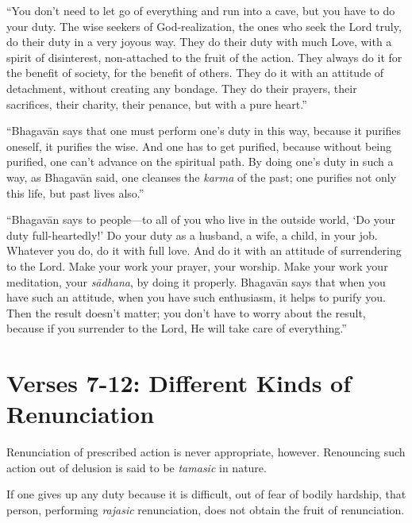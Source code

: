 \enquote{You don’t need to let go of everything and run into a cave, but you have to do your duty. The wise seekers of God-realization, the ones who seek the Lord truly, do their duty in a very joyous way. They do their duty with much Love, with a spirit of disinterest, non-attached to the fruit of the action. They always do it for the benefit of society, for the benefit of others. They do it with an attitude of detachment, without creating any bondage. They do their prayers, their sacrifices, their charity, their penance, but with a pure heart.}

\enquote{Bhagavān says that one must perform one’s duty in this way, because it purifies oneself, it purifies the wise. And one has to get purified, because without being purified, one can’t advance on the spiritual path. By doing one’s duty in such a way, as Bhagavān said, one cleanses the \textit{karma} of the past; one purifies not only this life, but past lives also.}

\enquote{Bhagavān says to people---to all of you who live in the outside world, \enquote{Do your duty full-heartedly!} Do your duty as a husband, a wife, a child, in your job. Whatever you do, do it with full love. And do it with an attitude of surrendering to the Lord. Make your work your prayer, your worship. Make your work your meditation, your \textit{sādhana}, by doing it properly. Bhagavān says that when you have such an attitude, when you have such enthusiasm, it helps to purify you. Then the result doesn’t matter; you don’t have to worry about the result, because if you surrender to the Lord, He will take care of everything.}

\section{Verses 7-12: Different Kinds of Renunciation}\label{sec-verses-7-12-different-kinds-of-renunciation}

{Renunciation of prescribed action is never appropriate, however. Renouncing such action out of delusion is said to be \textit{tamasic} in nature.}

{If one gives up any duty because it is difficult, out of fear of bodily hardship, that person, performing \textit{rajasic} renunciation, does not obtain the fruit of renunciation.}

